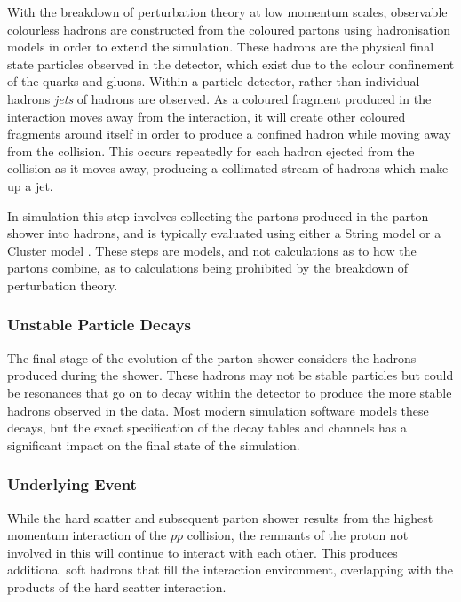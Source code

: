 			With the breakdown of perturbation theory at low momentum scales,  observable colourless hadrons are constructed from the coloured partons using hadronisation models in order to extend the simulation. These hadrons are the physical final state particles observed in the detector, which exist due to the colour confinement of the quarks and gluons. Within a particle detector, rather than individual hadrons \textit{jets} of hadrons are observed. As a coloured fragment produced in the interaction moves away from the interaction, it will create other coloured fragments around itself in order to produce a confined hadron while moving away from the collision. This occurs repeatedly for each hadron ejected from the collision as it moves away, producing a collimated stream of hadrons which make up a jet.

			In simulation this step involves collecting the partons produced in the parton shower into hadrons, and is typically evaluated using either a String model \cite{stringmodel} or a Cluster model \cite{clustermodel}. These steps are models, and not calculations as to how the partons combine, as to calculations being prohibited by the breakdown of perturbation theory.

		\subsubsection{Unstable Particle Decays}

			The final stage of the evolution of the parton shower considers the hadrons produced during the shower. These hadrons may not be stable particles but could be resonances that go on to decay within the detector to produce the more stable hadrons observed in the data. Most modern simulation software models these decays, but the exact specification of the decay tables and channels has a significant impact on the final state of the simulation.

		\subsubsection{Underlying Event}

			While the hard scatter and subsequent parton shower results from the highest momentum interaction of the $pp$ collision, the remnants of the proton not involved in this will continue to interact with each other. This produces additional soft hadrons that fill the interaction environment, overlapping with the products of the hard scatter interaction.

